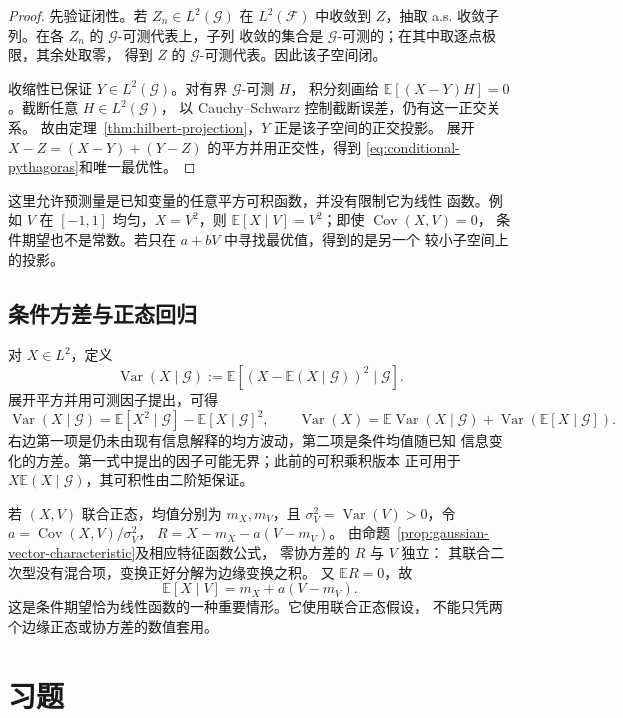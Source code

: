 \begin{proof}
先验证闭性。若 $Z_n\in L^2(\mathcal G)$ 在 $L^2(\mathcal F)$ 中收敛到
$Z$，抽取 a.s. 收敛子列。在各 $Z_n$ 的 $\mathcal G$-可测代表上，子列
收敛的集合是 $\mathcal G$-可测的；在其中取逐点极限，其余处取零，
得到 $Z$ 的 $\mathcal G$-可测代表。因此该子空间闭。

收缩性已保证 $Y\in L^2(\mathcal G)$。对有界 $\mathcal G$-可测 $H$，
积分刻画给 $\mathbb E[(X-Y)H]=0$。截断任意 $H\in L^2(\mathcal G)$，
以 Cauchy--Schwarz 控制截断误差，仍有这一正交关系。
故由定理~\ref{thm:hilbert-projection}，$Y$ 正是该子空间的正交投影。
展开 $X-Z=(X-Y)+(Y-Z)$ 的平方并用正交性，得到
\eqref{eq:conditional-pythagoras}和唯一最优性。
\end{proof}

这里允许预测量是已知变量的任意平方可积函数，并没有限制它为线性
函数。例如 $V$ 在 $[-1,1]$ 均匀，$X=V^2$，则
$\mathbb E[X\mid V]=V^2$；即使 $\operatorname{Cov}(X,V)=0$，
条件期望也不是常数。若只在 $a+bV$ 中寻找最优值，得到的是另一个
较小子空间上的投影。

\subsection{条件方差与正态回归}

对 $X\in L^2$，定义
\[
 \operatorname{Var}(X\mid\mathcal G)
   :=\mathbb E[(X-\mathbb E(X\mid\mathcal G))^2\mid\mathcal G].
\]
展开平方并用可测因子提出，可得
\begin{equation}
\label{eq:conditional-total-variance}
 \operatorname{Var}(X\mid\mathcal G)
 =\mathbb E[X^2\mid\mathcal G]-\mathbb E[X\mid\mathcal G]^2,
 \qquad
 \operatorname{Var}(X)
 =\mathbb E\operatorname{Var}(X\mid\mathcal G)
       +\operatorname{Var}(\mathbb E[X\mid\mathcal G]).
\end{equation}
右边第一项是仍未由现有信息解释的均方波动，第二项是条件均值随已知
信息变化的方差。第一式中提出的因子可能无界；此前的可积乘积版本
正可用于 $X\mathbb E(X\mid\mathcal G)$，其可积性由二阶矩保证。

若 $(X,V)$ 联合正态，均值分别为 $m_X,m_V$，且
$\sigma_V^2=\operatorname{Var}(V)>0$，令
$a=\operatorname{Cov}(X,V)/\sigma_V^2$，
$R=X-m_X-a(V-m_V)$。
由命题~\ref{prop:gaussian-vector-characteristic}及相应特征函数公式，
零协方差的 $R$ 与 $V$ 独立：
其联合二次型没有混合项，变换正好分解为边缘变换之积。
又 $\mathbb ER=0$，故
\[
 \mathbb E[X\mid V]=m_X+a(V-m_V).
\]
这是条件期望恰为线性函数的一种重要情形。它使用联合正态假设，
不能只凭两个边缘正态或协方差的数值套用。

\section*{习题}
